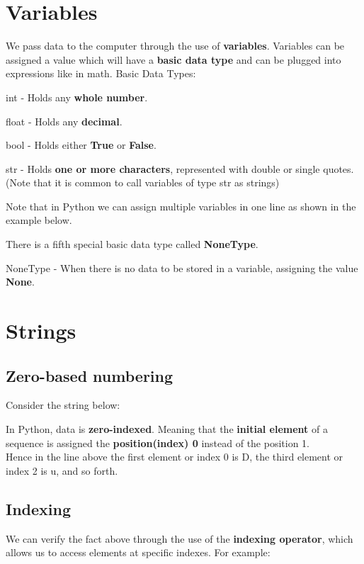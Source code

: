 \documentclass[13pt,a4paper,oneside]{book}
\begin{document}
\section{Variables}%
\label{sec:Variables}
We pass data to the computer through the use of \textbf{variables}. Variables can be assigned a value which will have a \textbf{basic data type} and can be plugged into expressions like in math. 
Basic Data Types:
\begin{center}
	int - Holds any \textbf{whole number}.
\end{center}

\begin{center}
	float - Holds any \textbf{decimal}.
\end{center}

\begin{center}
	bool - Holds either \textbf{True} or \textbf{False}.
\end{center}

\begin{center}
	str - Holds \textbf{one or more characters}, represented with double or single quotes. (Note that it is common to call variables of type str as strings)
\end{center}
\label{sub:E}

Note that in Python we can assign multiple variables in one line as shown in the example below.

There is a fifth special basic data type called \textbf{NoneType}.
\begin{center}
	NoneType - When there is no data to be stored in a variable, assigning the value \textbf{None}.
\end{center}

\break
\section{Strings}%
\label{sec:Strings}
\subsection{Zero-based numbering}%
\label{subsec:Zero-based numbering}

Consider the string below:

In Python, data is \textbf{zero-indexed}. Meaning that the \textbf{initial element} of a sequence is assigned the \textbf{position(index) 0} instead of the position 1.\\
Hence in the line above the first element or index 0 is D, the third element or index 2 is u, and so forth.
\subsection{Indexing}%
\label{subsec:Indexing}
We can verify the fact above through the use of the \textbf{indexing operator}, which allows us to access elements at specific indexes. For example:

\begin{tcolorbox}[title=Output,center title,hbox]
\end{tcolorbox}
\end{document}
